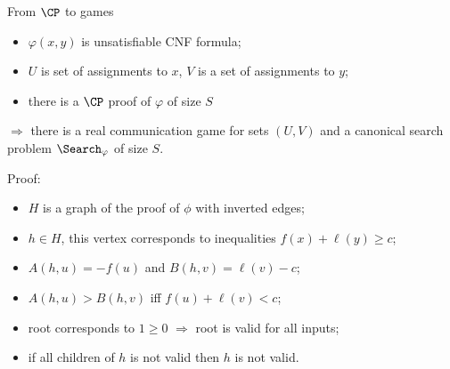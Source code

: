 \begin{frame}{From $\CP$ to games}

    \begin{lemma}
        \begin{itemize}
            \item $\varphi(x, y)$ is unsatisfiable CNF formula;
            \item $U$ is set of assignments to $x$, $V$ is a set of assignments to $y$;
            \item there is a $\CP$ proof of $\varphi$ of size $S$
        \end{itemize}
        $\Rightarrow$ there is a real communication game for sets $(U, V)$ and a canonical search problem $\Search_{\varphi}$
        of size $S$. 
    \end{lemma}

    \pause
    Proof:
    \pause
    \begin{itemize}
        \item $H$ is a graph of the proof of $\phi$ with inverted edges;
        \pause
        \item $h \in H$, this vertex corresponds to inequalities $f(x) + \ell(y) \ge c$;
        \pause
        \item $A(h, u) = -f(u)$ and $B(h, v) = \ell(v) - c$;
        \pause    
        \item $A(h, u) > B(h, v)$ iff $f(u) + \ell(v) < c$;
        \pause
        \item root corresponds to $1 \ge 0$ $\Rightarrow$ root is valid for all inputs;
        \pause
        \item if all children of $h$ is not valid then $h$ is not valid.
    \end{itemize}
\end{frame}
